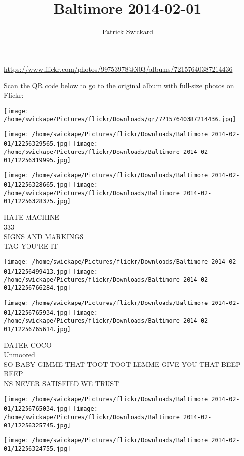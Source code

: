 \documentclass[10pt,letterpaper]{article}
\title{Baltimore 2014-02-01}
\author{Patrick Swickard}
\date{}
\begin{document}
\maketitle

\url{https://www.flickr.com/photos/99753978@N03/albums/72157640387214436}

Scan the QR code below to go to the original album with full-size photos on Flickr:

\texttt{[image: /home/swickape/Pictures/flickr/Downloads/qr/72157640387214436.jpg]}
\pagebreak

\texttt{[image: /home/swickape/Pictures/flickr/Downloads/Baltimore 2014-02-01/12256329565.jpg]}
\texttt{[image: /home/swickape/Pictures/flickr/Downloads/Baltimore 2014-02-01/12256319995.jpg]}

\texttt{[image: /home/swickape/Pictures/flickr/Downloads/Baltimore 2014-02-01/12256328665.jpg]}
\texttt{[image: /home/swickape/Pictures/flickr/Downloads/Baltimore 2014-02-01/12256328375.jpg]}

HATE MACHINE\\
333\\
SIGNS AND MARKINGS\\
TAG YOU'RE IT
\pagebreak

\texttt{[image: /home/swickape/Pictures/flickr/Downloads/Baltimore 2014-02-01/12256499413.jpg]}
\texttt{[image: /home/swickape/Pictures/flickr/Downloads/Baltimore 2014-02-01/12256766284.jpg]}

\texttt{[image: /home/swickape/Pictures/flickr/Downloads/Baltimore 2014-02-01/12256765934.jpg]}
\texttt{[image: /home/swickape/Pictures/flickr/Downloads/Baltimore 2014-02-01/12256765614.jpg]}

DATEK COCO\\
Unmoored\\
SO BABY GIMME THAT TOOT TOOT LEMME GIVE YOU THAT BEEP BEEP\\
NS NEVER SATISFIED WE TRUST
\pagebreak

\texttt{[image: /home/swickape/Pictures/flickr/Downloads/Baltimore 2014-02-01/12256765034.jpg]}
\texttt{[image: /home/swickape/Pictures/flickr/Downloads/Baltimore 2014-02-01/12256325745.jpg]}

\vspace{0.25in}
\texttt{[image: /home/swickape/Pictures/flickr/Downloads/Baltimore 2014-02-01/12256324755.jpg]}
\end{document}
